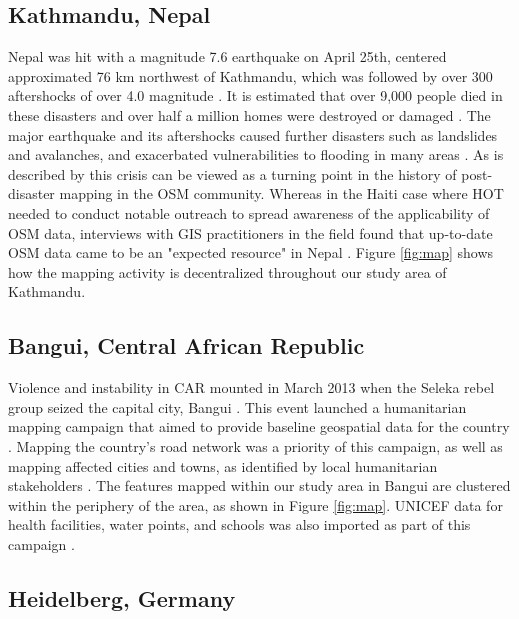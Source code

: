 \subsection{Kathmandu, Nepal}

Nepal was hit with a magnitude 7.6 earthquake on April 25th, centered approximated 76 km northwest of Kathmandu, which was followed by over 300 aftershocks of over 4.0 magnitude \parencite{noauthor_nepal_2015}. It is estimated that over 9,000 people died in these disasters and over half a million homes were destroyed or damaged \parencite{noauthor_nepal_2015}. The major earthquake and its aftershocks caused further disasters such as landslides and avalanches, and exacerbated vulnerabilities to flooding in many areas \parencite{noauthor_nepal_2015}. As is described by \textcite{soden_infrastructure_2016} this crisis can be viewed as a turning point in the history of post-disaster mapping in the OSM community. Whereas in the Haiti case where HOT needed to conduct notable outreach to spread awareness of the applicability of OSM data, interviews with GIS practitioners in the field found that up-to-date OSM data came to be an "expected resource" in Nepal \parencite[p. 2801]{soden_infrastructure_2016}. Figure \ref{fig:map} shows how the mapping activity is decentralized throughout our study area of Kathmandu.

\subsection{Bangui, Central African Republic}

Violence and instability in CAR mounted in March 2013 when the Seleka rebel group seized the capital city, Bangui \parencite{noauthor_violence_2020}. This event launched a humanitarian mapping campaign that aimed to provide baseline geospatial data for the country \parencite{noauthor_wikiproject_2020-1}. Mapping the country's road network was a priority of this campaign, as well as mapping affected cities and towns, as identified by local humanitarian stakeholders \parencite{noauthor_wikiproject_2020-1}. The features mapped within our study area in Bangui are clustered within the periphery of the area, as shown in Figure \ref{fig:map}. UNICEF data for health facilities, water points, and schools was also imported as part of this campaign \parencite{noauthor_wikiproject_2020-1}.

\subsection{Heidelberg, Germany}

